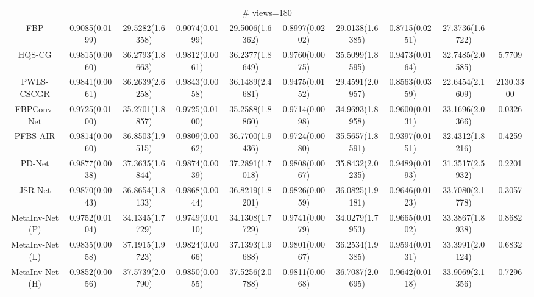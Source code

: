 \documentclass[journal,twoside]{IEEEtran}
\begin{document}
\begin{table*}[ht]
\begin{tabular}{|c|c|c|c|c|c|c|c|c|c|}
   
 \multicolumn{10}{|c|}{\cellcolor{gbygreen}\# views=180} \\
  \cline{1-10}
FBP
&0.9085(0.0199) &29.5282(1.6358) 
&0.9074(0.0199) &29.5006(1.6362) 
&0.8997(0.0202) &29.0138(1.6385) 
&0.8715(0.0251) &27.3736(1.6722) &-\\
  \cline{1-10}
 HQS-CG
&0.9815(0.0060) &36.2793(1.8663) 
&0.9812(0.0061) &36.2377(1.8649) 
&0.9760(0.0075) &35.5099(1.8595) 
&0.9473(0.0164) &32.7485(2.0585) &5.7709\\
  \cline{1-10}
PWLS-CSCGR 
&0.9841(0.0061) &36.2639(2.6258)
&0.9843(0.0058) &36.1489(2.4681) 
&0.9475(0.0152) &29.4591(2.0957) 
&0.8563(0.0359) &22.6454(2.1609) &2130.3300\\
    \cline{1-10}
 FBPConv-Net 
&0.9725(0.0100) &35.2701(1.8857) 
&0.9725(0.0100) &35.2588(1.8860) 
&0.9714(0.0098) &34.9693(1.8958) 
&0.9600(0.0131) &33.1696(2.0366) &0.0326\\
    \cline{1-10}
 PFBS-AIR
&0.9814(0.0060) &36.8503(1.9515) 
&0.9809(0.0062) &36.7700(1.9436) 
&0.9724(0.0080) &35.5657(1.8591) 
&0.9397(0.0151) &32.4312(1.8216) &0.4259\\
    \cline{1-10}
PD-Net
&\cellcolor{gbypink}0.9877(0.0038) &\cellcolor{gbyblue}37.3635(1.6844) 
&\cellcolor{gbypink}0.9874(0.0039) &\cellcolor{gbyblue}37.2891(1.7018) 
&0.9808(0.0067) &35.8432(2.0235) 
&0.9489(0.0193) &31.3517(2.5932) &0.2201\\
  \cline{1-10}
  JSR-Net
&\cellcolor{gbyblue}0.9870(0.0043) &36.8654(1.8133) 
&\cellcolor{gbyblue}0.9868(0.0044) &36.8219(1.8201) 
&\cellcolor{gbypink}0.9826(0.0059) &36.0825(1.9181) 
&\cellcolor{gbyblue}0.9646(0.0123) &\cellcolor{gbyblue}33.7080(2.1778) &0.3057\\
  \cline{1-10}
  MetaInv-Net (P)
&0.9752(0.0104) &34.1345(1.7729)
&0.9749(0.0110) &34.1308(1.7729) 
&0.9741(0.0079) &34.0279(1.7953) 
&\cellcolor{gbypink}0.9665(0.0102) &33.3867(1.8938) &0.8682\\
  \cline{1-10}
MetaInv-Net (L) 
&0.9835(0.0058) &37.1915(1.9723)
&0.9824(0.0066) &37.1393(1.9688) 
&0.9801(0.0067) &\cellcolor{gbyblue}36.2534(1.9385) 
&0.9594(0.0131) &33.3991(2.0124) &0.6832\\
   \cline{1-10}
 MetaInv-Net (H)
&0.9852(0.0056) &\cellcolor{gbypink}37.5739(2.0790) 
&0.9850(0.0055) &\cellcolor{gbypink}37.5256(2.0788)
&\cellcolor{gbyblue}0.9811(0.0068) &\cellcolor{gbypink}36.7087(2.0695) 
&0.9642(0.0118) &\cellcolor{gbypink}33.9069(2.1356) &0.7296\\
   \cline{1-10}
\hline
\end{tabular}
\end{table*}
\end{document}

